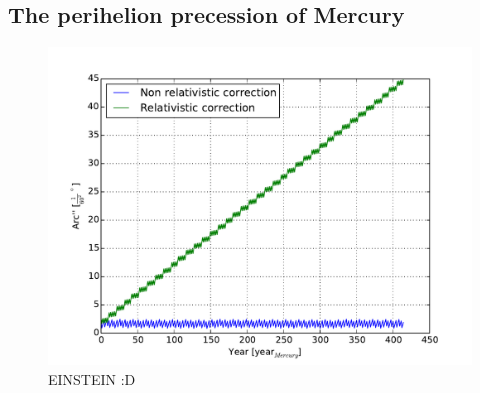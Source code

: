 \subsection{The perihelion precession of Mercury}

\begin{figure}[H]
    \centering
    \includegraphics[width=\linewidth]{result/bilder/perihelion.pdf}
    \caption{EINSTEIN :D }
    \label{fig:three-body}
\end{figure}














